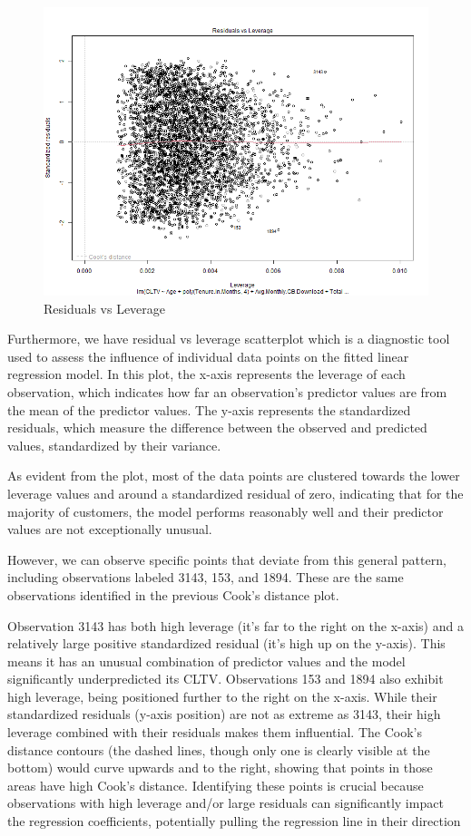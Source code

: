 \documentclass[
]{article}
\begin{document}
\begin{figure}

{\centering \includegraphics[width=0.85\linewidth]{Plots/residuals_vs_leverage} 

}

\caption{Residuals vs Leverage}\label{fig:res-vs-lev-img}
\end{figure}

Furthermore, we have residual vs leverage scatterplot which is a
diagnostic tool used to assess the influence of individual data points
on the fitted linear regression model. In this plot, the x-axis
represents the leverage of each observation, which indicates how far an
observation's predictor values are from the mean of the predictor
values. The y-axis represents the standardized residuals, which measure
the difference between the observed and predicted values, standardized
by their variance.

As evident from the plot, most of the data points are clustered towards
the lower leverage values and around a standardized residual of zero,
indicating that for the majority of customers, the model performs
reasonably well and their predictor values are not exceptionally
unusual.

However, we can observe specific points that deviate from this general
pattern, including observations labeled 3143, 153, and 1894. These are
the same observations identified in the previous Cook's distance plot.

Observation 3143 has both high leverage (it's far to the right on the
x-axis) and a relatively large positive standardized residual (it's high
up on the y-axis). This means it has an unusual combination of predictor
values and the model significantly underpredicted its CLTV. Observations
153 and 1894 also exhibit high leverage, being positioned further to the
right on the x-axis. While their standardized residuals (y-axis
position) are not as extreme as 3143, their high leverage combined with
their residuals makes them influential. The Cook's distance contours
(the dashed lines, though only one is clearly visible at the bottom)
would curve upwards and to the right, showing that points in those areas
have high Cook's distance. Identifying these points is crucial because
observations with high leverage and/or large residuals can significantly
impact the regression coefficients, potentially pulling the regression
line in their direction
\end{document}
